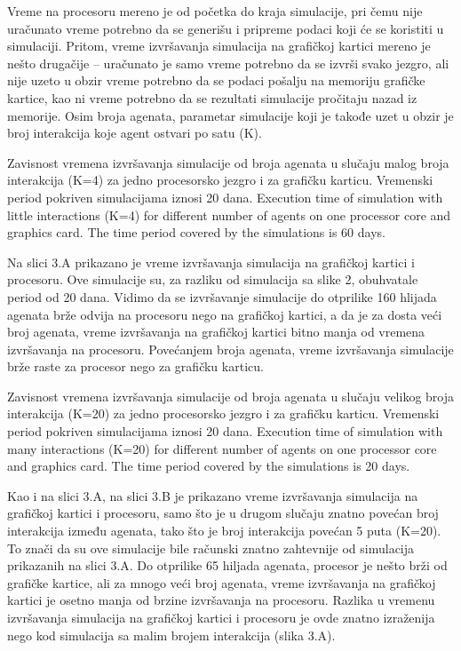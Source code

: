 Vreme na procesoru mereno je od početka do kraja simulacije, pri čemu nije
uračunato vreme potrebno da se generišu i pripreme podaci koji će se koristiti u
simulaciji. Pritom, vreme izvršavanja simulacija na grafičkoj kartici mereno je nešto
drugačije – uračunato je samo vreme potrebno da se izvrši svako jezgro, ali nije uzeto u
obzir vreme potrebno da se podaci pošalju na memoriju grafičke kartice, kao ni vreme
potrebno da se rezultati simulacije pročitaju nazad iz memorije. Osim broja agenata,
parametar simulacije koji je takođe uzet u obzir je broj interakcija koje agent ostvari po
satu (K).

    {Zavisnost vremena izvršavanja simulacije od broja agenata u slučaju malog broja interakcija (K=4) za jedno procesorsko jezgro i za grafičku karticu. Vremenski period pokriven simulacijama iznosi 20 dana. }
    {Execution time of simulation with little interactions (K=4) for different number of agents on one processor core and graphics card. The time period covered by the simulations is 60 days.}

Na slici 3.A prikazano je vreme izvršavanja simulacija na grafičkoj kartici i
procesoru. Ove simulacije su, za razliku od simulacija sa slike 2, obuhvatale period od
20 dana. Vidimo da se izvršavanje simulacije do otprilike 160 hlijada agenata brže
odvija na procesoru nego na grafičkoj kartici, a da je za dosta veći broj agenata, vreme
izvršavanja na grafičkoj kartici bitno manja od vremena izvršavanja na procesoru.
Povećanjem broja agenata, vreme izvršavanja simulacije brže raste za procesor nego
za grafičku karticu.

    {Zavisnost vremena izvršavanja simulacije od broja agenata u slučaju velikog broja interakcija (K=20) za jedno procesorsko jezgro i za grafičku karticu. Vremenski period pokriven simulacijama iznosi 20 dana.}
    {Execution time of simulation with many interactions (K=20) for different number of agents on one processor core and graphics card. The time period covered by the simulations is 20 days.}

Kao i na slici 3.A, na slici 3.B je prikazano vreme izvršavanja simulacija na
grafičkoj kartici i procesoru, samo što je u drugom slučaju znatno povećan broj
interakcija između agenata, tako što je broj interakcija povećan 5 puta (K=20). To znači
da su ove simulacije bile računski znatno zahtevnije od simulacija prikazanih na slici
3.A. Do otprilike 65 hiljada agenata, procesor je nešto brži od grafičke kartice, ali za
mnogo veći broj agenata, vreme izvršavanja na grafičkoj kartici je osetno manja od
brzine izvršavanja na procesoru. Razlika u vremenu izvršavanja simulacija na grafičkoj
kartici i procesoru je ovde znatno izraženija nego kod simulacija sa malim brojem
interakcija (slika 3.A).

